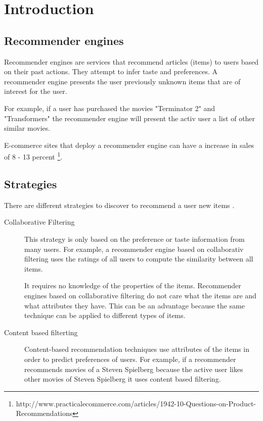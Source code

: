 \section{Introduction}
\label{sec:intro}

\subsection{Recommender engines}
\label{sec:recommenderengines}

Recommender engines are services that recommend articles (items) to users based on their past actions. They attempt to infer taste and preferences. A recommender engine presents the user previously unknown items that are of interest for the user. 

For example, if a user has purchased the movies "Terminator 2" and "Transformers" the recommender engine will present the activ user a list of other similar movies.

E-commerce sites that deploy a recommender engine can have a increase in sales of 8 - 13 percent \footnote{http://www.practicalecommerce.com/articles/1942-10-Questions-on-Product-Recommendations}.

\subsection{Strategies}
\label{sec:strategies}

There are different strategies to discover to recommend a user new items \cite{Owen}.
\begin{description}
\item[Collaborative Filtering] This strategy is only based on the preference or taste information from many users. For example, a recommender engine based on collaborativ filtering uses the ratings of all users to compute the similarity between all items. 

It requires no knowledge of the properties of the items. Recommender engines based on collaborative filtering do not care what the items are and what attributes they have. This can be an advantage because the same technique can be applied to different types of items. 
\item[Content based filterting] Content-based recommendation techniques use attributes of the items in order to predict preferences of users. For example, if a recommender recommends movies of a Steven Spielberg because the active user likes other movies of Steven Spielberg it uses content based filtering.
\end{description}


